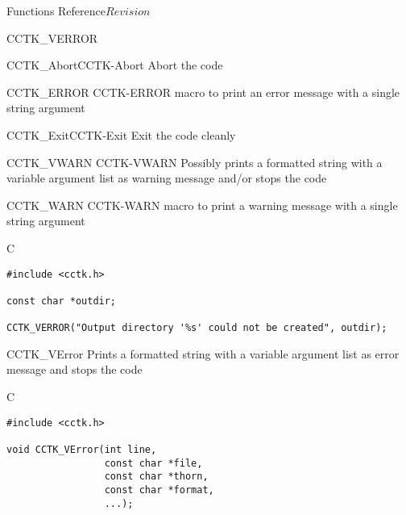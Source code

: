 \begin{cactuspart}{ Functions Reference}{}{$Revision$}
\begin{FunctionDescription}{CCTK\_VERROR}
\begin{SeeAlsoSection}
\begin{SeeAlso2}{CCTK\_Abort}{CCTK-Abort}
Abort the code
\end{SeeAlso2}
\begin{SeeAlso2} {CCTK\_ERROR} {CCTK-ERROR}
macro to print an error message with a single string argument
\end{SeeAlso2}
\begin{SeeAlso2}{CCTK\_Exit}{CCTK-Exit}
Exit the code cleanly
\end{SeeAlso2}
\begin{SeeAlso2} {CCTK\_VWARN} {CCTK-VWARN}
Possibly prints a formatted string with a variable argument list as
warning message and/or stops the code
\end{SeeAlso2}
\begin{SeeAlso2} {CCTK\_WARN} {CCTK-WARN}
macro to print a warning message with a single string argument
\end{SeeAlso2}
\end{SeeAlsoSection}

\begin{ExampleSection}
\begin{Example}{C}
\begin{verbatim}
#include <cctk.h>

const char *outdir;

CCTK_VERROR("Output directory '%s' could not be created", outdir);
\end{verbatim}
\end{Example}
\end{ExampleSection}
\end{FunctionDescription}


\begin{FunctionDescription}{CCTK\_VError}
\label{CCTK-VError}
Prints a formatted string with a variable argument list as error
message and stops the code

\begin{SynopsisSection}
\begin{Synopsis}{C}
\begin{verbatim}
#include <cctk.h>

void CCTK_VError(int line,
                 const char *file,
                 const char *thorn,
                 const char *format,
                 ...);
\end{verbatim}
\end{Synopsis}
\end{SynopsisSection}


\end{FunctionDescription}
\end{cactuspart}
